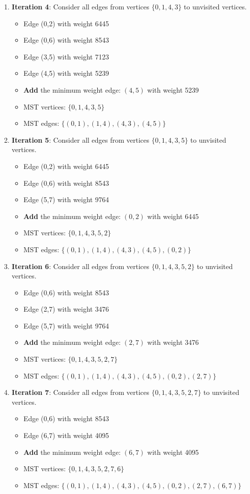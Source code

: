 \documentclass{article}
\theoremstyle{definition}
\begin{document}
\begin{enumerate}
\item \textbf{Iteration 4}: Consider all edges from vertices $\{0,1,4,3\}$ to unvisited vertices.
   \begin{itemize}
   \item Edge (0,2) with weight 6445
   \item Edge (0,6) with weight 8543
   \item Edge (3,5) with weight 7123
   \item Edge (4,5) with weight 5239
   \item \textbf{Add} the minimum weight edge: $(4,5)$ with weight 5239
   \item MST vertices: $\{0,1,4,3,5\}$
   \item MST edges: $\{(0,1), (1,4), (4,3), (4,5)\}$
   \end{itemize}

\item \textbf{Iteration 5}: Consider all edges from vertices $\{0,1,4,3,5\}$ to unvisited vertices.
   \begin{itemize}
   \item Edge (0,2) with weight 6445
   \item Edge (0,6) with weight 8543
   \item Edge (5,7) with weight 9764
   \item \textbf{Add} the minimum weight edge: $(0,2)$ with weight 6445
   \item MST vertices: $\{0,1,4,3,5,2\}$
   \item MST edges: $\{(0,1), (1,4), (4,3), (4,5), (0,2)\}$
   \end{itemize}

\item \textbf{Iteration 6}: Consider all edges from vertices $\{0,1,4,3,5,2\}$ to unvisited vertices.
   \begin{itemize}
   \item Edge (0,6) with weight 8543
   \item Edge (2,7) with weight 3476
   \item Edge (5,7) with weight 9764
   \item \textbf{Add} the minimum weight edge: $(2,7)$ with weight 3476
   \item MST vertices: $\{0,1,4,3,5,2,7\}$
   \item MST edges: $\{(0,1), (1,4), (4,3), (4,5), (0,2), (2,7)\}$
   \end{itemize}

\item \textbf{Iteration 7}: Consider all edges from vertices $\{0,1,4,3,5,2,7\}$ to unvisited vertices.
   \begin{itemize}
   \item Edge (0,6) with weight 8543
   \item Edge (6,7) with weight 4095
   \item \textbf{Add} the minimum weight edge: $(6,7)$ with weight 4095
   \item MST vertices: $\{0,1,4,3,5,2,7,6\}$
   \item MST edges: $\{(0,1), (1,4), (4,3), (4,5), (0,2), (2,7), (6,7)\}$
   \end{itemize}
\end{enumerate}
\end{document}
